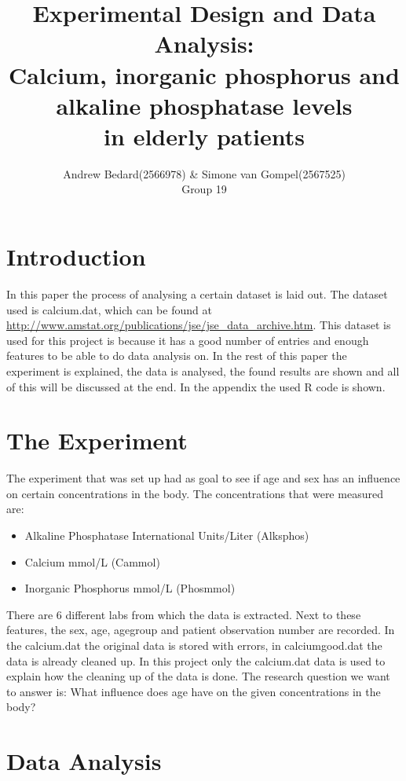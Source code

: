 \documentclass{article}
\title{Experimental Design and Data Analysis: \\ \large{Calcium, inorganic phosphorus and alkaline phosphatase levels\\ in elderly patients}}
\author{Andrew Bedard(2566978) \& Simone van Gompel(2567525) \\ Group 19}
\begin{document}
  \maketitle

  \section{Introduction}
    In this paper the process of analysing a certain dataset is laid out.
    The dataset used is calcium.dat, which can be found at \url{http://www.amstat.org/publications/jse/jse_data_archive.htm}.
    This dataset is used for this project is because it has a good number of entries and enough features to be able to do data analysis on.
    In the rest of this paper the experiment is explained, the data is analysed, the found results are shown and all of this will be discussed at the end.
    In the appendix the used R code is shown.

  \section{The Experiment}
    The experiment that was set up had as goal to see if age and sex has an influence on certain concentrations in the body.
    The concentrations that were measured are:
    \begin{itemize}
      \item Alkaline Phosphatase International Units/Liter (Alksphos)
      \item Calcium mmol/L (Cammol)
      \item Inorganic Phosphorus mmol/L (Phosmmol)
    \end{itemize}
    There are 6 different labs from which the data is extracted.
    Next to these features, the sex, age, agegroup and patient observation number are recorded.
    In the calcium.dat the original data is stored with errors, in calciumgood.dat the data is already cleaned up.
    In this project only the calcium.dat data is used to explain how the cleaning up of the data is done.
    The research question we want to answer is: What influence does age have on the given concentrations in the body?

  \section{Data Analysis}
\end{document}
